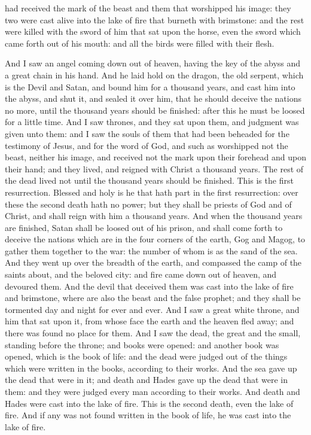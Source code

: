 had received the mark of the beast and them that worshipped his image: they two were cast alive into the lake of fire that burneth with brimstone: and the rest were killed with the sword of him that sat upon the horse, even the sword which came forth out of his mouth: and all the birds were filled with their flesh. 

And I saw an angel coming down out of heaven, having the key of the abyss and a great chain in his hand. And he laid hold on the dragon, the old serpent, which is the Devil and Satan, and bound him for a thousand years, and cast him into the abyss, and shut it, and sealed it over him, that he should deceive the nations no more, until the thousand years should be finished: after this he must be loosed for a little time.  And I saw thrones, and they sat upon them, and judgment was given unto them: and I saw the souls of them that had been beheaded for the testimony of Jesus, and for the word of God, and such as worshipped not the beast, neither his image, and received not the mark upon their forehead and upon their hand; and they lived, and reigned with Christ a thousand years. The rest of the dead lived not until the thousand years should be finished. This is the first resurrection. Blessed and holy is he that hath part in the first resurrection: over these the second death hath no power; but they shall be priests of God and of Christ, and shall reign with him a thousand years.  And when the thousand years are finished, Satan shall be loosed out of his prison, and shall come forth to deceive the nations which are in the four corners of the earth, Gog and Magog, to gather them together to the war: the number of whom is as the sand of the sea. And they went up over the breadth of the earth, and compassed the camp of the saints about, and the beloved city: and fire came down out of heaven, and devoured them. And the devil that deceived them was cast into the lake of fire and brimstone, where are also the beast and the false prophet; and they shall be tormented day and night for ever and ever.  And I saw a great white throne, and him that sat upon it, from whose face the earth and the heaven fled away; and there was found no place for them. And I saw the dead, the great and the small, standing before the throne; and books were opened: and another book was opened, which is the book of life: and the dead were judged out of the things which were written in the books, according to their works. And the sea gave up the dead that were in it; and death and Hades gave up the dead that were in them: and they were judged every man according to their works. And death and Hades were cast into the lake of fire. This is the second death, even the lake of fire. And if any was not found written in the book of life, he was cast into the lake of fire. 

